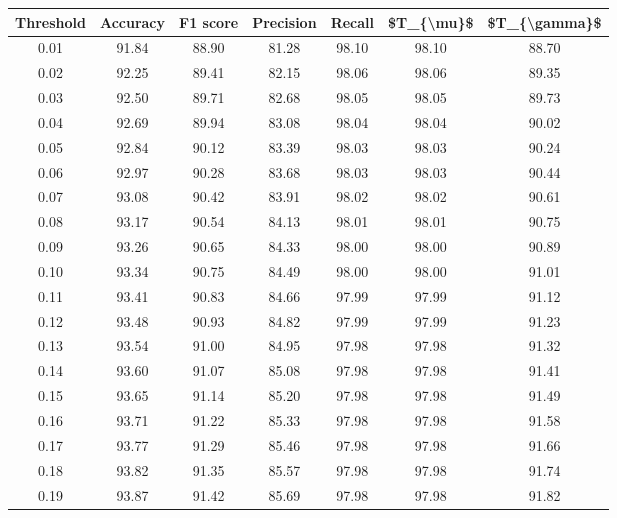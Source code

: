 \begin{tabular}{|c|c|c|c|c|c|c|}
\hline
 Threshold &  Accuracy &  F1 score &  Precision &  Recall &  \$T\_\{\textbackslash mu\}\$ &  \$T\_\{\textbackslash gamma\}\$ \\
\hline
      0.01 &     91.84 &     88.90 &      81.28 &   98.10 &      98.10 &         88.70 \\
      0.02 &     92.25 &     89.41 &      82.15 &   98.06 &      98.06 &         89.35 \\
      0.03 &     92.50 &     89.71 &      82.68 &   98.05 &      98.05 &         89.73 \\
      0.04 &     92.69 &     89.94 &      83.08 &   98.04 &      98.04 &         90.02 \\
      0.05 &     92.84 &     90.12 &      83.39 &   98.03 &      98.03 &         90.24 \\
      0.06 &     92.97 &     90.28 &      83.68 &   98.03 &      98.03 &         90.44 \\
      0.07 &     93.08 &     90.42 &      83.91 &   98.02 &      98.02 &         90.61 \\
      0.08 &     93.17 &     90.54 &      84.13 &   98.01 &      98.01 &         90.75 \\
      0.09 &     93.26 &     90.65 &      84.33 &   98.00 &      98.00 &         90.89 \\
      0.10 &     93.34 &     90.75 &      84.49 &   98.00 &      98.00 &         91.01 \\
      0.11 &     93.41 &     90.83 &      84.66 &   97.99 &      97.99 &         91.12 \\
      0.12 &     93.48 &     90.93 &      84.82 &   97.99 &      97.99 &         91.23 \\
      0.13 &     93.54 &     91.00 &      84.95 &   97.98 &      97.98 &         91.32 \\
      0.14 &     93.60 &     91.07 &      85.08 &   97.98 &      97.98 &         91.41 \\
      0.15 &     93.65 &     91.14 &      85.20 &   97.98 &      97.98 &         91.49 \\
      0.16 &     93.71 &     91.22 &      85.33 &   97.98 &      97.98 &         91.58 \\
      0.17 &     93.77 &     91.29 &      85.46 &   97.98 &      97.98 &         91.66 \\
      0.18 &     93.82 &     91.35 &      85.57 &   97.98 &      97.98 &         91.74 \\
      0.19 &     93.87 &     91.42 &      85.69 &   97.98 &      97.98 &         91.82 \\

\end{tabular}
